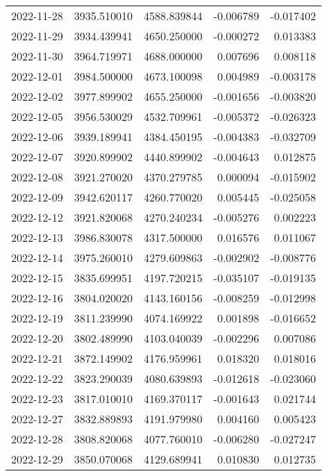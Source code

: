 \begin{tabular}{lrrrr}
2022-11-28 & 3935.510010 & 4588.839844 &       -0.006789 &    -0.017402 \\
2022-11-29 & 3934.439941 & 4650.250000 &       -0.000272 &     0.013383 \\
2022-11-30 & 3964.719971 & 4688.000000 &        0.007696 &     0.008118 \\
2022-12-01 & 3984.500000 & 4673.100098 &        0.004989 &    -0.003178 \\
2022-12-02 & 3977.899902 & 4655.250000 &       -0.001656 &    -0.003820 \\
2022-12-05 & 3956.530029 & 4532.709961 &       -0.005372 &    -0.026323 \\
2022-12-06 & 3939.189941 & 4384.450195 &       -0.004383 &    -0.032709 \\
2022-12-07 & 3920.899902 & 4440.899902 &       -0.004643 &     0.012875 \\
2022-12-08 & 3921.270020 & 4370.279785 &        0.000094 &    -0.015902 \\
2022-12-09 & 3942.620117 & 4260.770020 &        0.005445 &    -0.025058 \\
2022-12-12 & 3921.820068 & 4270.240234 &       -0.005276 &     0.002223 \\
2022-12-13 & 3986.830078 & 4317.500000 &        0.016576 &     0.011067 \\
2022-12-14 & 3975.260010 & 4279.609863 &       -0.002902 &    -0.008776 \\
2022-12-15 & 3835.699951 & 4197.720215 &       -0.035107 &    -0.019135 \\
2022-12-16 & 3804.020020 & 4143.160156 &       -0.008259 &    -0.012998 \\
2022-12-19 & 3811.239990 & 4074.169922 &        0.001898 &    -0.016652 \\
2022-12-20 & 3802.489990 & 4103.040039 &       -0.002296 &     0.007086 \\
2022-12-21 & 3872.149902 & 4176.959961 &        0.018320 &     0.018016 \\
2022-12-22 & 3823.290039 & 4080.639893 &       -0.012618 &    -0.023060 \\
2022-12-23 & 3817.010010 & 4169.370117 &       -0.001643 &     0.021744 \\
2022-12-27 & 3832.889893 & 4191.979980 &        0.004160 &     0.005423 \\
2022-12-28 & 3808.820068 & 4077.760010 &       -0.006280 &    -0.027247 \\
2022-12-29 & 3850.070068 & 4129.689941 &        0.010830 &     0.012735 \\

\end{tabular}
